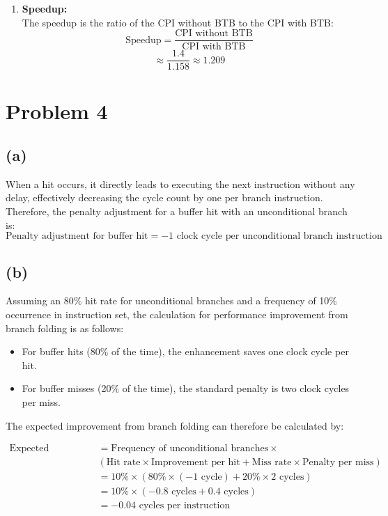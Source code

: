 \documentclass{article}
\begin{document}
\begin{enumerate}
  \item \textbf{Speedup:} \\
  The speedup is the ratio of the CPI without BTB to the CPI with BTB:
  \begin{equation*}
    \text{Speedup} = \frac{\text{CPI without BTB}}{\text{CPI with BTB}}
  \end{equation*}
  \begin{equation*}
    \approx \frac{1.4}{1.158} \approx 1.209
  \end{equation*}
\end{enumerate}

\section{Problem 4}

\subsection*{(a)}
When a hit occurs, it directly leads to executing the next instruction without any delay, effectively decreasing the cycle count by one per branch instruction. Therefore, the penalty adjustment for a buffer hit with an unconditional branch is:
\begin{equation*}
    \text{Penalty adjustment for buffer hit} = -1 \text{ clock cycle per unconditional branch instruction}
\end{equation*}

\subsection*{(b)}
Assuming an 80\% hit rate for unconditional branches and a frequency of 10\% occurrence in instruction set, the calculation for performance improvement from branch folding is as follows:

\begin{itemize}
  \item For buffer hits (80\% of the time), the enhancement saves one clock cycle per hit.
  \item For buffer misses (20\% of the time), the standard penalty is two clock cycles per miss.
\end{itemize}

The expected improvement from branch folding can therefore be calculated by:

\[
\begin{aligned}
    \text{Expected improvement} &= \text{Frequency of unconditional branches} \times \\
    &(\text{Hit rate} \times \text{Improvement per hit} + \text{Miss rate} \times \text{Penalty per miss})\\
    &= 10\% \times (80\% \times (-1 \text{ cycle}) + 20\% \times 2 \text{ cycles})\\
    &= 10\% \times (-0.8 \text{ cycles} + 0.4 \text{ cycles})\\
    &= -0.04 \text{ cycles per instruction}
\end{aligned}
\]
\end{document}
